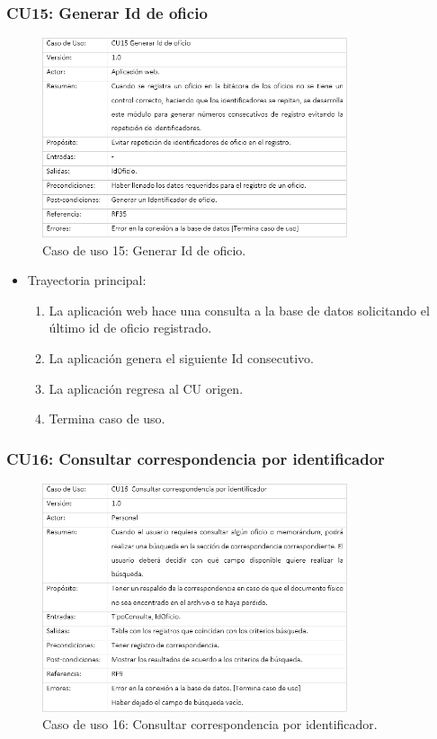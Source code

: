 		\subsubsection{CU15: Generar Id de oficio}
\begin{figure}[htbp!]
		\centering
			\includegraphics[width=0.8\textwidth]{images/CU/CU15}
		\caption{Caso de uso 15: Generar Id de oficio.}
		\label{Tabla}
	\end{figure}
	
\begin{itemize}
	\item Trayectoria principal:
	\begin{enumerate}
		\item 	La aplicación web hace una consulta a la base de datos solicitando el último id de oficio registrado.
\item	La aplicación genera el siguiente Id consecutivo.
\item	La aplicación regresa al CU origen. 
\item	Termina caso de uso.

	\end{enumerate}
	
\end{itemize}

		\subsubsection{CU16: Consultar correspondencia por identificador}
\begin{figure}[htbp!]
		\centering
			\includegraphics[width=0.8\textwidth]{images/CU/CU16}
		\caption{Caso de uso 16: Consultar correspondencia por identificador.}
		\label{Tabla}
	\end{figure}
	
